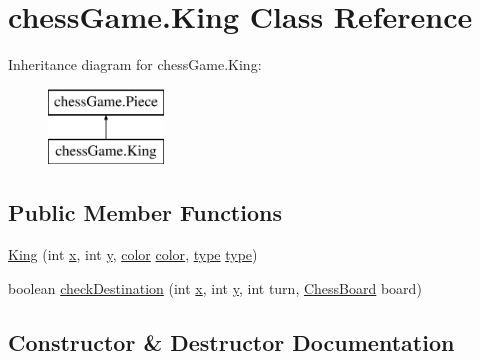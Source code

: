 \hypertarget{classchess_game_1_1_king}{}\section{chess\+Game.\+King Class Reference}
\label{classchess_game_1_1_king}
Inheritance diagram for chess\+Game.\+King\+:\begin{figure}[H]
\begin{center}
\leavevmode
\includegraphics[height=2.000000cm]{classchess_game_1_1_king}
\end{center}
\end{figure}
\subsection*{Public Member Functions}
\begin{DoxyCompactItemize}
\item 
\hyperlink{classchess_game_1_1_king_a57fd36aaec2bb5284f32e28711d7d1e7}{King} (int \hyperlink{classchess_game_1_1_piece_aeb2d3374492005d799aa6b7b85be40e7}{x}, int \hyperlink{classchess_game_1_1_piece_a56e4d8d18eca3fd03a6bd5d6112d6359}{y}, \hyperlink{classchess_game_1_1_piece_ad5117cbbbaebf3a27c4f3c2bcbd6678b}{color} \hyperlink{classchess_game_1_1_piece_ad5117cbbbaebf3a27c4f3c2bcbd6678b}{color}, \hyperlink{classchess_game_1_1_piece_a1370c7f61581a1b72fa8ac2fd1af70a2}{type} \hyperlink{classchess_game_1_1_piece_a1370c7f61581a1b72fa8ac2fd1af70a2}{type})
\item 
boolean \hyperlink{classchess_game_1_1_king_a391861e09b20c62177db5f399ad94320}{check\+Destination} (int \hyperlink{classchess_game_1_1_piece_aeb2d3374492005d799aa6b7b85be40e7}{x}, int \hyperlink{classchess_game_1_1_piece_a56e4d8d18eca3fd03a6bd5d6112d6359}{y}, int turn, \hyperlink{classchess_game_1_1_chess_board}{Chess\+Board} board)
\end{DoxyCompactItemize}


\subsection{Constructor \& Destructor Documentation}
\hypertarget{classchess_game_1_1_king_a57fd36aaec2bb5284f32e28711d7d1e7}{}\label{classchess_game_1_1_king_a57fd36aaec2bb5284f32e28711d7d1e7} 
